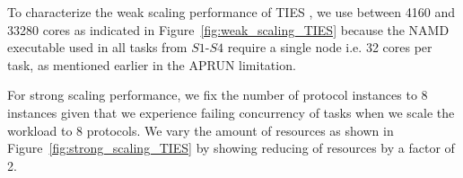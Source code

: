 








To characterize the weak scaling performance of TIES  
, 
we use between 4160 and 33280 cores as indicated in 
Figure~\ref{fig:weak_scaling_TIES} because the NAMD executable used in all
tasks 
 from
$S1$-$S4$ require  a single node i.e. 32 cores per 
task, as mentioned earlier in the APRUN limitation. 

For strong scaling performance, we fix the number of protocol instances to 8
instances given that we experience failing 
concurrency of tasks when we scale the workload to 8 protocols. 
We vary the amount of resources as shown in
Figure~\ref{fig:strong_scaling_TIES} by showing reducing of resources by a 
factor of 2. 

